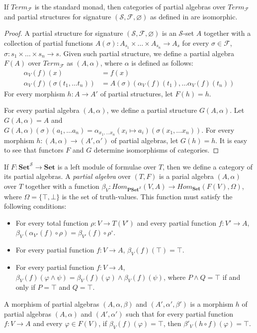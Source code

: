 \documentclass[reqno]{amsart}
\theoremstyle{definition}
\theoremstyle{remark}
\newcommand{\cat}[1]{\mathbf{#1}}
\newcommand{\Set}{\cat{Set}}
\newcommand{\PSet}{\cat{PSet}}
\numberwithin{figure}{section}
\begin{document}
\begin{lem}
If $Term_\mathcal{F}$ is the standard monad, then categories of partial algebras over $Term_\mathcal{F}$
    and partial structures for signature $(\mathcal{S},\mathcal{F},\varnothing)$ as defined in \cite{PHL} are isomorphic.
\end{lem}
\begin{proof}
A partial structure for signature $(\mathcal{S},\mathcal{F},\varnothing)$ is an $\mathcal{S}$-set $A$ together with a collection of partial functions
    $A(\sigma) : A_{s_1} \times \ldots \times A_{s_n} \to A_s$ for every $\sigma \in \mathcal{F}$, $\sigma : s_1 \times \ldots \times s_n \to s$.
Given such partial structure, we define a partial algebra $F(A)$ over $Term_\mathcal{F}$ as $(A,\alpha)$, where $\alpha$ is defined as follows:
\begin{align*}
\alpha_V(f)(x) & = f(x) \\
\alpha_V(f)(\sigma(t_1, \ldots t_n)) & = A(\sigma)(\alpha_V(f)(t_1), \ldots \alpha_V(f)(t_n))
\end{align*}
For every morphism $h : A \to A'$ of partial structures, let $F(h) = h$.

For every partial algebra $(A,\alpha)$, we define a partial structure $G(A,\alpha)$.
Let $G(A,\alpha) = A$ and $G(A,\alpha)(\sigma)(a_1, \ldots a_n) = \alpha_{x_1, \ldots x_n}(x_i \mapsto a_i)(\sigma(x_1, \ldots x_n))$.
For every morphism $h : (A,\alpha) \to (A',\alpha')$ of partial algebras, let $G(h) = h$.
It is easy to see that functors $F$ and $G$ determine isomorphisms of categories.
\end{proof}

If $F : \Set^\mathcal{S} \to \Set$ is a left module of formulae over $T$, then we define a category of its partial algebras.
A \emph{partial algebra} over $(T,F)$ is a parial algebra $(A,\alpha)$ over $T$ together with a function $\beta_V : Hom_{\PSet^\mathcal{S}}(V,A) \to Hom_\Set(F(V),\Omega)$,
    where $\Omega = \{ \top, \bot \}$ is the set of truth-values.
This function must satisfy the following conditions:
\begin{itemize}
\item For every total function $\rho : V \to T(V')$ and every partial function $f : V' \to A$, $\beta_V(\alpha_{V'}(f) \circ \rho) = \beta_{V'}(f) \circ \rho^\circ$.
\item For every partial function $f : V \to A$, $\beta_V(f)(\top) = \top$.
\item For every partial function $f : V \to A$, $\beta_V(f)(\varphi \land \psi) = \beta_V(f)(\varphi) \land \beta_V(f)(\psi)$,
    where $P \land Q = \top$ if and only if $P = \top$ and $Q = \top$.
\end{itemize}
A morphism of partial algebras $(A,\alpha,\beta)$ and $(A',\alpha',\beta')$ is a morphism $h$ of partial algebras $(A,\alpha)$ and $(A',\alpha')$
    such that for every partial function $f : V \to A$ and every $\varphi \in F(V)$, if $\beta_V(f)(\varphi) = \top$, then $\beta'_V(h \circ f)(\varphi) = \top$.
\end{document}
